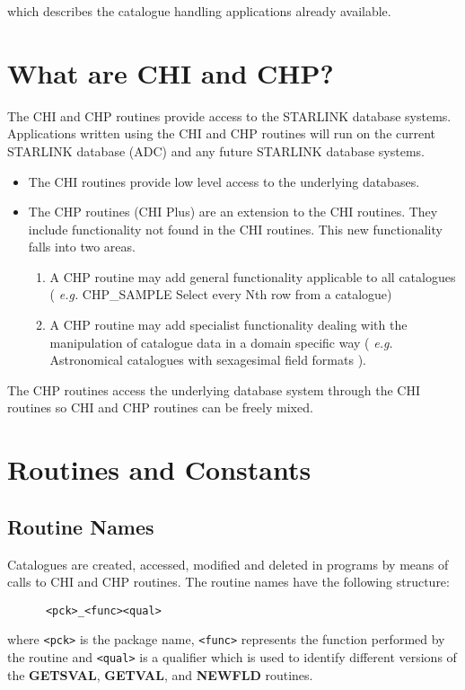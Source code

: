 which describes the catalogue handling applications already available.

\section {What are CHI and CHP?}

The CHI and CHP routines provide access to the STARLINK database systems.
Applications written using the CHI and CHP routines will
run on the current STARLINK database (ADC) and any future STARLINK database
systems.
\begin{itemize}
   \item The CHI routines provide low level access to the underlying databases.
   \item The CHP routines (CHI Plus) are an extension to the CHI routines.
They include
functionality not found in the CHI routines.
This new functionality falls into two areas.
\begin{enumerate}
  \item A CHP routine may add general functionality applicable
to all catalogues ( {\em e.g.} CHP\_SAMPLE Select every Nth row from a catalogue)
  \item A CHP routine may add specialist functionality dealing with the
manipulation of catalogue data in a domain specific way
( {\em e.g.} Astronomical catalogues with sexagesimal
field formats ).
\end{enumerate}
\end{itemize}
The CHP routines access the underlying database system through the CHI routines
so CHI and CHP routines can be freely mixed.

\section{Routines and Constants}

\subsection{Routine Names}

Catalogues are created, accessed, modified and deleted in programs by means of
calls to CHI and CHP routines. The routine names have the following structure:

\begin{verbatim}
      <pck>_<func><qual>
\end{verbatim}

where \verb+<pck>+ is the package name, \verb+<func>+ represents the
function performed by the routine and \verb+<qual>+ is a qualifier which is
used to identify different versions of the {\bf GETSVAL}, {\bf GETVAL},
and {\bf NEWFLD} routines.

